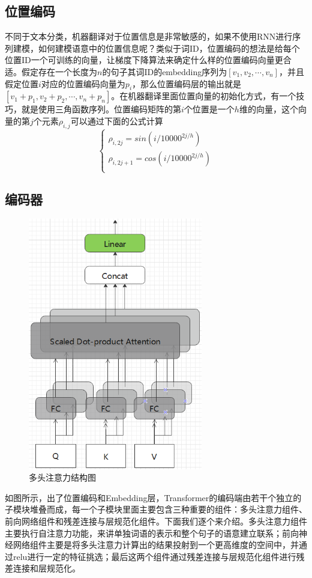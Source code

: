 \documentclass[twoside,a4paper,12pt]{book}%
\begin{document}
\subsection{位置编码}
不同于文本分类，机器翻译对于位置信息是非常敏感的，如果不使用\gls{RNN}进行序列建模，如何建模语意中的位置信息呢？类似于词ID，位置编码的想法是给每个位置ID一个可训练的向量，让梯度下降算法来确定什么样的位置编码向量更合适。假定存在一个长度为$n$的句子其词ID的embedding序列为$[v_1,v_2,\cdots,v_n]$，并且假定位置$i$对应的位置编码向量为$p_i$，那么位置编码层的输出就是$[v_1 + p_1,v_2+p_2,\cdots,v_n+p_n]$。在机器翻译里面位置向量的初始化方式，有一个技巧，就是使用三角函数序列。位置编码矩阵的第$i$个位置是一个$h$维的向量，这个向量的第$j$个元素$\rho_{i,j}$可以通过下面的公式计算
$$
\left \{
\begin{aligned}
\rho_{i,2j}=sin(i/10000^{2j/h})\\
\rho_{i,2j+1}=cos(i/10000^{2j/h})\\
\end{aligned}
\right . 
$$

\subsection{编码器}
\begin{figure}[h]
	\begin{center}
		\includegraphics[width=3.0in]{figures/bert1.png}
		\caption{多头注意力结构图}
		\label{fig:bert1}
	\end{center}
\end{figure}
如图所示，出了位置编码和Embedding层，Transformer的编码端由若干个独立的子模块堆叠而成，每一个子模块里面主要包含三种重要的组件：多头注意力组件、前向网络组件和残差连接与层规范化组件。下面我们逐个来介绍。多头注意力组件主要执行自注意力功能，来讲单独词语的表示和整个句子的语意建立联系；前向神经网络组件主要是将多头注意力计算出的结果投射到一个更高维度的空间中，并通过relu进行一定的特征挑选；最后这两个组件通过残差连接与层规范化组件进行残差连接和层规范化。
\end{document}
